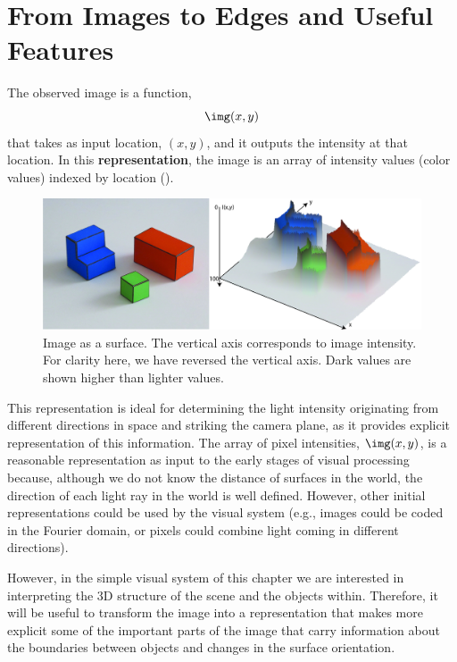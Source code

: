 \section{From Images to Edges and Useful Features}
\label{sec:algo_simple_world}


The observed image is a function, 
\begin{equation}
\img(x,y) 
\end{equation}
that takes as input location, $(x,y)$, and it outputs the intensity at that location. In this {\bf representation}, the image is an array of intensity values (color values) indexed by location (\fig{\ref{fig:imageAsSurface}}). 


\begin{figure}[t]
\centerline{
\includegraphics[width=1\linewidth]{figures/simplesystem/imageAsSurface.jpg}
} 
\caption{Image as a surface. The vertical axis corresponds to image intensity. For clarity here, we have reversed the vertical axis. Dark values are shown higher than lighter values.} 
\label{fig:imageAsSurface}
\end{figure}

This representation is ideal for determining the light intensity originating from different directions in space and striking the camera plane, as it provides explicit representation of this information. The array of pixel intensities, $\img(x,y)$, is a reasonable representation as input to the early stages of visual processing because, although we do not know the distance of surfaces in the world, the direction of each light ray in the world is well defined. However, other initial representations could be used by the visual system (e.g., images could be coded in the Fourier domain, or pixels could combine light coming in different directions). 


However, in the simple visual system of this chapter we are interested in interpreting the 3D structure of the scene and the objects within. Therefore, it will be useful to transform the image into a representation that makes more explicit some of the important parts of the image that carry information about the boundaries between objects and changes in the surface orientation. 

